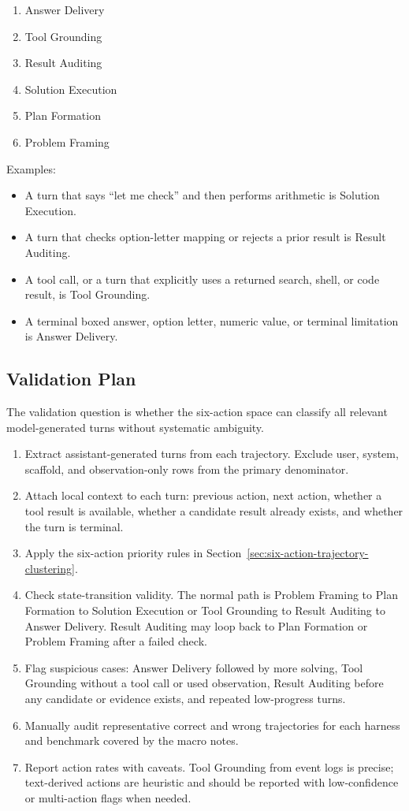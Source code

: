 \begin{enumerate}
\item Answer Delivery
\item Tool Grounding
\item Result Auditing
\item Solution Execution
\item Plan Formation
\item Problem Framing
\end{enumerate}

Examples:

\begin{itemize}
\item A turn that says ``let me check'' and then performs arithmetic is Solution
Execution.
\item A turn that checks option-letter mapping or rejects a prior result is
Result Auditing.
\item A tool call, or a turn that explicitly uses a returned search, shell, or
code result, is Tool Grounding.
\item A terminal boxed answer, option letter, numeric value, or terminal
limitation is Answer Delivery.
\end{itemize}

\subsection{Validation Plan}

The validation question is whether the six-action space can classify all
relevant model-generated turns without systematic ambiguity.

\begin{enumerate}
\item Extract assistant-generated turns from each trajectory. Exclude user,
system, scaffold, and observation-only rows from the primary denominator.
\item Attach local context to each turn: previous action, next action, whether a
tool result is available, whether a candidate result already exists, and whether
the turn is terminal.
\item Apply the six-action priority rules in Section~\ref{sec:six-action-trajectory-clustering}.
\item Check state-transition validity. The normal path is Problem Framing to
Plan Formation to Solution Execution or Tool Grounding to Result Auditing to
Answer Delivery. Result Auditing may loop back to Plan Formation or Problem
Framing after a failed check.
\item Flag suspicious cases: Answer Delivery followed by more solving, Tool
Grounding without a tool call or used observation, Result Auditing before any
candidate or evidence exists, and repeated low-progress turns.
\item Manually audit representative correct and wrong trajectories for each
harness and benchmark covered by the macro notes.
\item Report action rates with caveats. Tool Grounding from event logs is
precise; text-derived actions are heuristic and should be reported with
low-confidence or multi-action flags when needed.
\end{enumerate}

